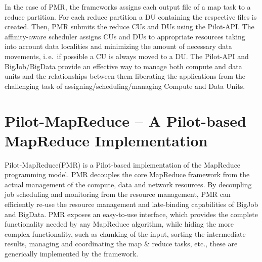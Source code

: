 \documentclass{acm_proc_article-sp}
\newcommand{\jhanote}[1]{ {\textcolor{red} { ***SJ: #1 }}}
\newcommand{\alnote}[1]{ {\textcolor{blue} { ***andreL: #1 }}}
\newcommand{\pnote}[1]{ {\textcolor{magenta} { ***pradeep: #1 }}}
\newcommand{\secrev}[1]{ {\textcolor{Bittersweet} { ***reviewer2: #1 }}}
\newcommand{\alnote}[1]{}
\newcommand{\pnote}[1]{}
\newcommand{\jhanote}[1]{}
\newcommand{\upp}{\vspace*{-0.5em}}
\newcommand{\pilot}{Pilot\xspace}
\newcommand{\pilotmapreduce}{Pilot-MapReduce\xspace}
\newcommand{\dataunits}{Data Units\xspace}
\begin{document}
In the case of PMR, the frameworks assigns each output file of a map task to a
reduce partition. For each reduce partition a DU containing the respective files
is created. Then, PMR submits the reduce CUs and DUs using the Pilot-API. The
affinity-aware scheduler assigns CUs and DUs to appropriate resources taking
into account data localities and minimizing the amount of necessary data
movements, i.\,e.\ if possible a CU is always moved to a DU.
The Pilot-API and BigJob/BigData provide an effective way
to manage both compute and data units and the relationships between
them liberating the applications from the challenging
task of assigning/scheduling/managing Compute and \dataunits.






\upp
\section{Pilot-MapReduce -- A Pilot-based MapReduce Implementation}
\label{sec-pilot-mr}

  

\pilotmapreduce (PMR) is a \pilot-based implementation of the
MapReduce programming model. PMR decouples the core MapReduce
framework from the actual management of the compute, data and network
resources. By decoupling job scheduling and monitoring from the
resource management, PMR can efficiently re-use the resource
management and late-binding capabilities of BigJob and BigData. PMR
exposes an easy-to-use interface, which provides the %
complete functionality needed by any
MapReduce algorithm, while hiding the more complex functionality, such
as chunking of the input, sorting the intermediate results, managing
and coordinating the map \& reduce tasks, etc., these are generically
implemented by the framework.
\end{document}

